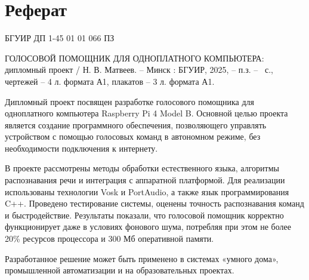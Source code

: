 \section*{Реферат}
\thispagestyle{empty} %

\noindent БГУИР ДП 1-45 01 01 066 ПЗ
\newline


\nohyphens{ГОЛОСОВОЙ ПОМОЩНИК ДЛЯ ОДНОПЛАТНОГО КОМПЬЮТЕРА:} дипломный проект / Н. В. Матвеев. -- Минск : БГУИР, 2025, -- п.з. -- \pageref{LastPage}~с., чертежей -- 4 л. формата А1, плакатов -- 3 л. формата А1.

Дипломный проект посвящен разработке голосового помощника для одноплатного компьютера Raspberry Pi 4 Model B. Основной целью проекта является создание программного обеспечения, позволяющего управлять устройством с помощью голосовых команд в автономном режиме, без необходимости подключения к интернету.

В проекте рассмотрены методы обработки естественного языка, алгоритмы распознавания речи и интеграция с аппаратной платформой. Для реализации использованы технологии Vosk и PortAudio, а также язык программирования C++. Проведено тестирование системы, оценены точность распознавания команд и быстродействие. Результаты показали, что голосовой помощник корректно функционирует даже в условиях фонового шума, потребляя при этом не более 20\% ресурсов процессора и 300 Мб оперативной памяти.

Разработанное решение может быть применено в системах «умного дома», промышленной автоматизации и на образовательных проектах.

\clearpage
